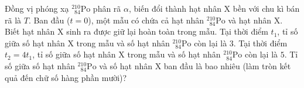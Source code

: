 	\begin{ex}%
		Đồng vị phóng xạ $^{210}_{\phantom{2}84}\text{Po}$ phân rã $\alpha$, biến đổi thành hạt nhân X bền với chu kì bán rã là $T$. Ban đầu ($t=0$), một mẫu có chứa cả hạt nhân $^{210}_{\phantom{2}84}\text{Po}$ và hạt nhân X. Biết hạt nhân X sinh ra được giữ lại hoàn toàn trong mẫu. Tại thời điểm $t_1$, tỉ số giữa số hạt nhân X trong mẫu và số hạt nhân $^{210}_{\phantom{2}84}\text{Po}$ còn lại là $3$. Tại thời điểm $t_2=4t_1$, tỉ số giữa số hạt nhân X trong mẫu và số hạt nhân $^{210}_{\phantom{2}84}\text{Po}$ còn lại là $5$. Tỉ số giữa số hạt nhân $^{210}_{\phantom{2}84}\text{Po}$ và số hạt nhân X ban đầu là bao nhiêu (làm tròn kết quả đến chữ số hàng phần mười)?
		\par
	\end{ex}

